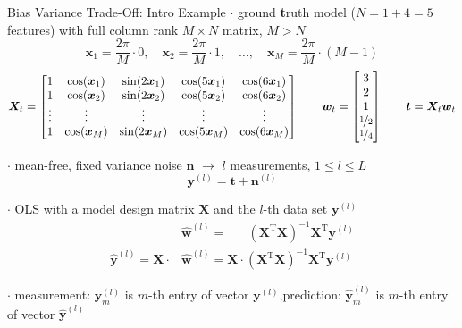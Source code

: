 \documentclass[mathserif, aspectratio=1610]{intbeamer}
\begin{document}
\begin{frame}[t]{Bias Variance Trade-Off: Intro Example}
%
\vspace{-1em}
%
$\cdot$ ground \textbf{t}ruth model ($N=1+4=5$ features) with full column rank $M \times N$ matrix, $M>N$
$$\bm{x}_1 = \frac{2\pi}{M} \cdot 0,\quad\bm{x}_2 = \frac{2\pi}{M} \cdot 1,\quad\dots,\quad\bm{x}_M = \frac{2\pi}{M} \cdot (M-1)$$
$$
\bm{X}_t =
\begin{bmatrix}
1 & \cos(\bm{x}_1) & \sin(2\bm{x}_1) & \cos(5\bm{x}_1) & \cos(6\bm{x}_1) \\
1 & \cos(\bm{x}_2) & \sin(2\bm{x}_2) & \cos(5\bm{x}_2) & \cos(6\bm{x}_2)\\
\vdots & \vdots & \vdots & \vdots & \vdots\\
1 & \cos(\bm{x}_M) & \sin(2\bm{x}_M) & \cos(5\bm{x}_M) & \cos(6\bm{x}_M)\\
\end{bmatrix}\qquad
\bm{w}_t =
\begin{bmatrix}
3\\2\\1\\\nicefrac{1}{2}\\\nicefrac{1}{4}
\end{bmatrix}
\qquad
\bm{t} = \bm{X}_t \bm{w}_t
$$

$\cdot$ mean-free, fixed variance noise $\bm{n}$ $\rightarrow$ $l$ measurements, $1 \leq l \leq L$
$$\bm{y}^{(l)} = \bm{t} + \bm{n}^{(l)}$$

$\cdot$ OLS with a model design matrix $\bm{X}$ and the $l$-th data set $\bm{y}^{(l)}$
\begin{align*}
&\hat{\bm{w}}^{(l)} = \quad\,\,\,\,(\bm{X}^\mathrm{T} \bm{X})^{-1} \bm{X}^\mathrm{T} \bm{y}^{(l)}\\
\hat{\bm{y}}^{(l)} = \bm{X}\cdot &\hat{\bm{w}}^{(l)} = \bm{X}\cdot (\bm{X}^\mathrm{T} \bm{X})^{-1} \bm{X}^\mathrm{T} \bm{y}^{(l)}
\end{align*}

$\cdot$ measurement: $\bm{y}_m^{(l)}$ is $m$-th entry of vector $\bm{y}^{(l)}$,\quad prediction: $\hat{\bm{y}}_m^{(l)}$ is $m$-th entry of vector $\hat{\bm{y}}^{(l)}$

\end{frame}
\end{document}

